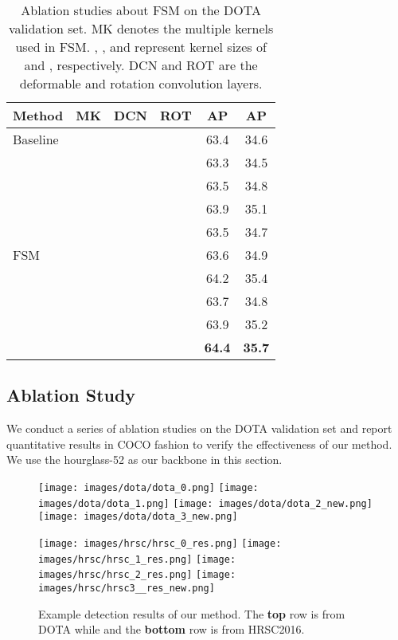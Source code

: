 \documentclass[10pt,twocolumn,letterpaper]{article}
\begin{document}
\begin{table}\centering
\begin{tabular}{lccccc}
	\toprule
      Method &MK &DCN &ROT & AP & AP  \\ \hline
      Baseline & & & & 63.4 & 34.6 \\ \hline
     \multirow{9}{*}{FSM}
      & & & & 63.3 & 34.5 \\ 
      &  & & & 63.5 & 34.8 \\
      &  & & & 63.9 & 35.1 \\
      &  & & & 63.5 & 34.7\\
      &  & & & 63.6 &34.9 \\
      &  & & & 64.2 &35.4 \\
      &  & & & 63.7 & 34.8\\
      &  & & & 63.9 & 35.2 \\
      &  & & &\textbf{64.4} & \textbf{35.7} \\
	\bottomrule
\end{tabular}
\caption{Ablation studies about FSM on the DOTA validation set. MK denotes the multiple kernels used in FSM. , , and  represent kernel sizes of  and , respectively. DCN and ROT are the deformable and rotation convolution layers.}
\label{tab:fsm}
\end{table}
 
\subsection{Ablation Study}
We conduct a series of ablation studies on the DOTA validation set and report quantitative results in COCO fashion to verify the effectiveness of our method.
We use the hourglass-52 as our backbone in this section.
\newcommand\exampleresultwidth{0.24}
\begin{figure*}\centering
		\texttt{[image: images/dota/dota\_0.png]}
		\texttt{[image: images/dota/dota\_1.png]}
		\texttt{[image: images/dota/dota\_2\_new.png]}
		\texttt{[image: images/dota/dota\_3\_new.png]}

		\vspace{3pt}
		\texttt{[image: images/hrsc/hrsc\_0\_res.png]}
		\texttt{[image: images/hrsc/hrsc\_1\_res.png]}
		\texttt{[image: images/hrsc/hrsc\_2\_res.png]}
		\texttt{[image: images/hrsc/hrsc3\_\_res\_new.png]}
	\caption{Example detection results of our method. The \textbf{top} row is from DOTA while and the \textbf{bottom} row is from HRSC2016.}
	\vspace{-1mm}
	\label{fig:vis_results}
\end{figure*}
 
\end{document}
